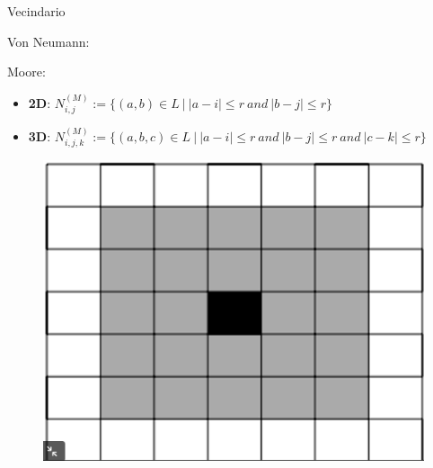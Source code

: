 \begin{frame}{Vecindario}
\begin{block}{Von Neumann:}
    \end{block}
    \begin{block}{Moore:}
        \begin{minipage}[t]{0.8\linewidth}
            \begin{itemize}
                \item \textbf{2D}: $N_{i,j}^{(M)}:=\{(a,b) \in L\ |\ |a-i|\leq r\ and\ |b - j| \leq r \}$
                \item \textbf{3D}: $N_{i,j,k}^{(M)}:=\{(a, b, c) \in L\ |\ |a-i|\leq r\ and\ |b - j|  \leq r\ and\ |c - k|  \leq r\}$
            \end{itemize}
        \end{minipage}%
        \hfill%
        \begin{minipage}[t]{0.2\linewidth}
            \begin{figure}[H]
                \centering
                \includegraphics[width=0.7\linewidth]{pic/01-intro/moore}
            \end{figure}
        \end{minipage}

    \end{block}
\end{frame}

